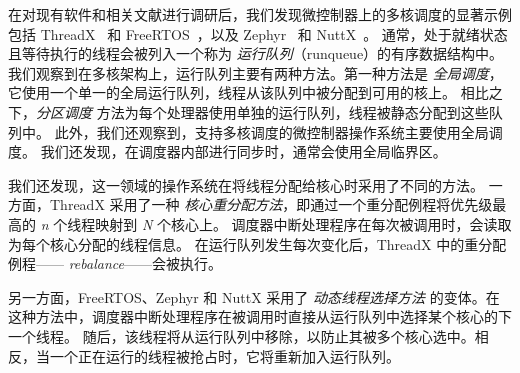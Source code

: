 在对现有软件和相关文献进行调研后，我们发现微控制器上的多核调度的显著示例包括 ThreadX~\cite{threadx} 和 FreeRTOS~\cite{freertos}，以及 Zephyr~\cite{zephyr} 和 NuttX~\cite{nuttx}。
通常，处于就绪状态且等待执行的线程会被列入一个称为 \emph{运行队列}（runqueue）的有序数据结构中。%
我们观察到在多核架构上，运行队列主要有两种方法。第一种方法是 \textit{全局调度}，它使用一个单一的全局运行队列，线程从该队列中被分配到可用的核上。
相比之下，\textit{分区调度} 方法为每个处理器使用单独的运行队列，线程被静态分配到这些队列中。
此外，我们还观察到，支持多核调度的微控制器操作系统主要使用全局调度。
我们还发现，在调度器内部进行同步时，通常会使用全局临界区。

我们还发现，这一领域的操作系统在将线程分配给核心时采用了不同的方法。
一方面，ThreadX 采用了一种 \textit{核心重分配方法}，即通过一个重分配例程将优先级最高的 \textit{n} 个线程映射到 \textit{N} 个核心上。
调度器中断处理程序在每次被调用时，会读取为每个核心分配的线程信息。
在运行队列发生每次变化后，ThreadX 中的重分配例程—— \textit{rebalance}——会被执行。

另一方面，FreeRTOS、Zephyr 和 NuttX 采用了 \textit{动态线程选择方法} 的变体。在这种方法中，调度器中断处理程序在被调用时直接从运行队列中选择某个核心的下一个线程。
随后，该线程将从运行队列中移除，以防止其被多个核心选中。相反，当一个正在运行的线程被抢占时，它将重新加入运行队列。

